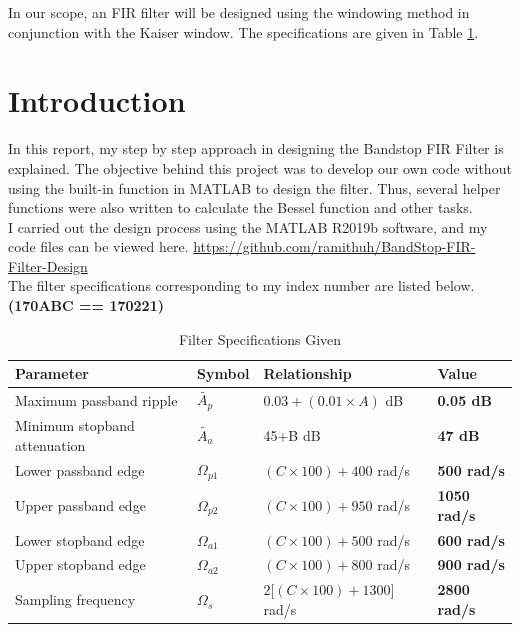 \documentclass[11pt]{article}
\begin{document}
In our scope, an FIR filter will be designed using the windowing method in conjunction with the Kaiser window. The specifications are given in Table \ref{tab:filter-specs}.  \\


% 




\section{Introduction} 
In this report, my step by step approach in designing the Bandstop FIR Filter is explained. The objective behind this project was to develop our own code without using the built-in function in MATLAB to design the filter. 
Thus, several helper functions were also written to calculate the Bessel function and other tasks. 
\\I carried out the design process using the MATLAB R2019b software, and my code files can be viewed here.
\href{https://github.com/ramithuh/BandStop-FIR-Filter-Design}{https://github.com/ramithuh/BandStop-FIR-Filter-Design \faGithub}\\

The filter specifications corresponding to my index number are listed below.
\\{\bf (170ABC == 170221)}
\begin{table}[H]
    \centering
    \caption{Filter Specifications Given }
    \label{tab:filter-specs}
    \begin{tabular}{@{}llll@{}}
    \toprule
    \textbf{Parameter}    & \textbf{Symbol}        & \textbf{Relationship}         & \textbf{Value}      \\ \midrule
    Maximum passband ripple & $\tilde{A_p}$    & $0.03 + (0.01 \times A)$ dB          & \textbf{0.05 dB}       \\
    Minimum stopband attenuation & $\tilde{A_a}$ & 45+B dB                       & \textbf{47 dB}      \\
    Lower passband edge& $\Omega_{p1}$        & $(C \times 100) + 400$ rad/s         & \textbf{500 rad/s}  \\
    Upper passband edge& $\Omega_{p2}$         & $(C \times 100) + 950$ rad/s        & \textbf{1050 rad/s} \\
    Lower stopband edge& $\Omega_{a1}$          & $(C \times 100) + 500$ rad/s         & \textbf{600 rad/s}  \\
    Upper stopband edge& $\Omega_{a2}$          & $(C \times 100) + 800$ rad/s         & \textbf{900 rad/s}  \\
    Sampling frequency&  $\Omega_{s}$          & $2{[}(C \times 100) + 1300{]}$ rad/s & \textbf{2800 rad/s} \\ \bottomrule
    \end{tabular}
    \end{table}
\end{document}

